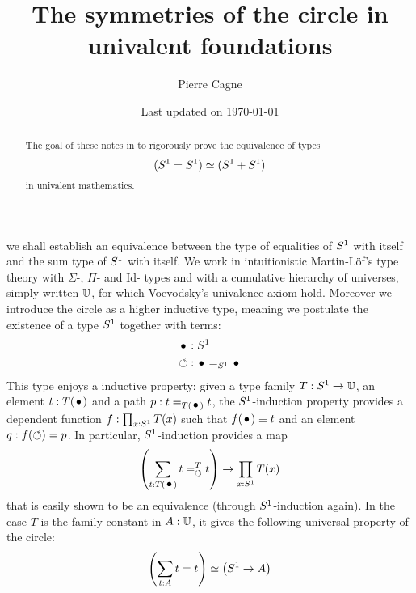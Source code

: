 \documentclass[english,a4paper]{tufte-handout}
\title{{\sffamily \bfseries The symmetries of the circle in univalent
    foundations}}%
\author{\normalfont Pierre Cagne} %
\date{\normalsize Last updated on \today}%
\def\U{\universe U}%
\begin{document}
\maketitle

\begin{abstract}
  The goal of these notes in to rigorously prove the equivalence of
  types
  \begin{displaymath}
    ({S^1} = {S^1}) \simeq ({S^1} + {S^1})
  \end{displaymath}
  in univalent mathematics.
\end{abstract}

 we shall establish an equivalence
between the type of equalities of ${S^1}$ with itself and the sum type
of ${S^1}$ with itself. We work in intuitionistic Martin-Löf's type
theory with $\Sigma$-, $\Pi$- and $\mathrm{Id}$- types and with a
cumulative hierarchy of universes, simply written $\U$, for
which Voevodsky's univalence axiom hold. Moreover we introduce the
circle as a higher inductive type, meaning we postulate the existence
of a type ${S^1}$ together with terms:
\begin{align}
  \label{eq:1}
  \base &: \Sc\\
  \Sloop &: \base =_{\Sc} \base
\end{align}
This type enjoys a inductive property: given a type family
$T : \Sc \to \U$, an element $t:T(\base)$ and a path
$p:t=_{T(\base)}t$, the ${S^1}$-induction property provides a dependent
function $f : \prod_{x:{S^1}}T(x)$ such that $f(\base) \jdeq t$ and an
element $q: f(\mathord{\circlearrowleft}) = p$. In particular, ${S^1}$-induction provides a
map
\begin{equation}
  \label{eq:2}
  \left(\sum_{t:T(\base)} \pathover t T \Sloop t\right) \to \prod_{x:\Sc}T(x)
\end{equation}
that is easily shown to be an equivalence (through ${S^1}$-induction
again). In the case $T$ is the family constant in $A:\U$, it gives the
following universal property of the circle:
\begin{equation}
  \label{eq:3}
  \left(\sum_{t:A}t=t\right) \simeq \left( {S^1} \to A \right)
\end{equation}
\end{document}
